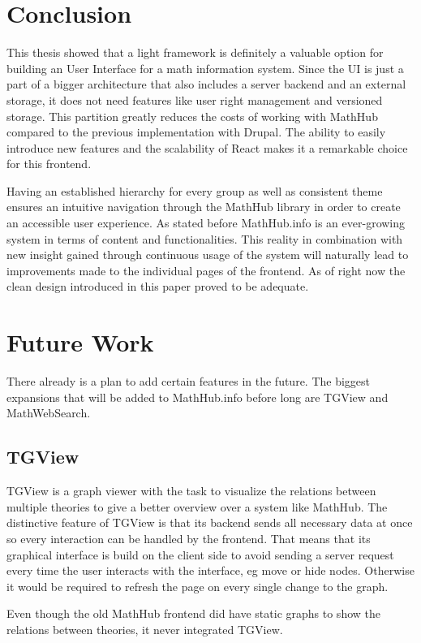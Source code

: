 \documentclass[11pt,a4paper]{article}
\begin{document}
\section{Conclusion} \label{conclusion}
This thesis showed that a light framework is definitely a valuable option for building an User Interface for a math information system.
Since the UI is just a part of a bigger architecture that also includes a server backend and an external storage, it does not need features like user right management and versioned storage.
This partition greatly reduces the costs of working with MathHub compared to the previous implementation with Drupal.
The ability to easily introduce new features and the scalability of React makes it a remarkable choice for this frontend.

Having an established hierarchy for every group as well as consistent theme ensures an intuitive navigation through the MathHub library in order to create an accessible user experience.
As stated before MathHub.info is an ever-growing system in terms of content and functionalities.
This reality in combination with new insight gained through continuous usage of the system will naturally lead to improvements made to the individual pages of the frontend.
As of right now the clean design introduced in this paper proved to be adequate.

\section{Future Work} \label{future}
There already is a plan to add certain features in the future. 
The biggest expansions that will be added to MathHub.info before long are TGView and MathWebSearch.

\subsection{TGView} 
TGView is a graph viewer with the task to visualize the relations between multiple theories to give a better overview over a system like MathHub.
The distinctive feature of TGView is that its backend sends all necessary data at once so every interaction can be handled by the frontend.
That means that its graphical interface is build on the client side to avoid sending a server request every time the user interacts with the interface, eg move or hide nodes.
Otherwise it would be required to refresh the page on every single change to the graph\cite{tgview}.
 
Even though the old MathHub frontend did have static graphs to show the relations between theories, it never integrated TGView.
 
\end{document}
